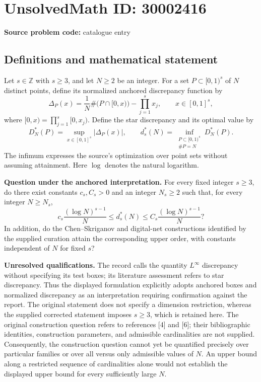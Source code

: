 \documentclass[11pt]{article}
\newcommand{\Z}{\mathbb{Z}}
\begin{document}
\section*{UnsolvedMath ID: 30002416}
\textbf{Source problem code:} catalogue entry
\subsection{Definitions and mathematical statement}
Let \(s\in\Z\) with \(s\geq3\), and let \(N\geq2\) be an integer. For a set \(P\subset[0,1)^s\) of \(N\) distinct points, define its normalized anchored discrepancy function by
\[
\Delta_P(x)=\frac{1}{N}\#\bigl(P\cap[0,x)\bigr)-\prod_{j=1}^s x_j,
\qquad x\in[0,1]^s,
\]
where \([0,x)=\prod_{j=1}^s[0,x_j)\). Define the star discrepancy and its optimal value by
\[
D_N^*(P)=\sup_{x\in[0,1]^s}|\Delta_P(x)|,
\qquad d_s^*(N)=\inf_{\substack{P\subset[0,1)^s\\ \#P=N}}D_N^*(P).
\]
The infimum expresses the source's optimization over point sets without assuming attainment. Here \(\log\) denotes the natural logarithm.

\textbf{Question under the anchored interpretation.} For every fixed integer \(s\geq3\), do there exist constants \(c_s,C_s>0\) and an integer \(N_s\geq2\) such that, for every integer \(N\geq N_s\),
\[
c_s\frac{(\log N)^{s-1}}{N}
\leq d_s^*(N)
\leq C_s\frac{(\log N)^{s-1}}{N}?
\]
In addition, do the Chen--Skriganov and digital-net constructions identified by the supplied curation attain the corresponding upper order, with constants independent of \(N\) for fixed \(s\)?

\textbf{Unresolved qualifications.} The record calls the quantity \(L^\infty\) discrepancy without specifying its test boxes; its literature assessment refers to star discrepancy. Thus the displayed formulation explicitly adopts anchored boxes and normalized discrepancy as an interpretation requiring confirmation against the report. The original statement does not specify a dimension restriction, whereas the supplied corrected statement imposes \(s\geq3\), which is retained here. The original construction question refers to references [4] and [6]; their bibliographic identities, construction parameters, and admissible cardinalities are not supplied. Consequently, the construction question cannot yet be quantified precisely over particular families or over all versus only admissible values of \(N\). An upper bound along a restricted sequence of cardinalities alone would not establish the displayed upper bound for every sufficiently large \(N\).
\end{document}
